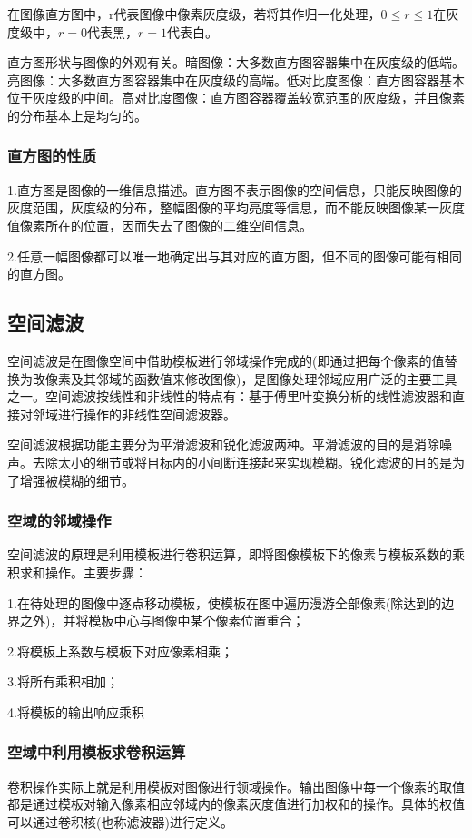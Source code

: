 \documentclass[11pt]{article}
\begin{document}
在图像直方图中，r代表图像中像素灰度级，若将其作归一化处理，$0\leq r\leq 1$在灰度级中，$r=0$代表黑，$r=1$代表白。

直方图形状与图像的外观有关。暗图像：大多数直方图容器集中在灰度级的低端。亮图像：大多数直方图容器集中在灰度级的高端。低对比度图像：直方图容器基本位于灰度级的中间。高对比度图像：直方图容器覆盖较宽范围的灰度级，并且像素的分布基本上是均匀的。
\subsubsection{直方图的性质}
1.直方图是图像的一维信息描述。直方图不表示图像的空间信息，只能反映图像的灰度范围，灰度级的分布，整幅图像的平均亮度等信息，而不能反映图像某一灰度值像素所在的位置，因而失去了图像的二维空间信息。

2.任意一幅图像都可以唯一地确定出与其对应的直方图，但不同的图像可能有相同的直方图。

\subsection{空间滤波}
空间滤波是在图像空间中借助模板进行邻域操作完成的(即通过把每个像素的值替换为改像素及其邻域的函数值来修改图像)，是图像处理邻域应用广泛的主要工具之一。空间滤波按线性和非线性的特点有：基于傅里叶变换分析的线性滤波器和直接对邻域进行操作的非线性空间滤波器。

空间滤波根据功能主要分为平滑滤波和锐化滤波两种。平滑滤波的目的是消除噪声。去除太小的细节或将目标内的小间断连接起来实现模糊。锐化滤波的目的是为了增强被模糊的细节。

\subsubsection{空域的邻域操作}
空间滤波的原理是利用模板进行卷积运算，即将图像模板下的像素与模板系数的乘积求和操作。主要步骤：

\noindent 1.在待处理的图像中逐点移动模板，使模板在图中遍历漫游全部像素(除达到的边界之外)，并将模板中心与图像中某个像素位置重合；

\noindent 2.将模板上系数与模板下对应像素相乘；

\noindent 3.将所有乘积相加；

\noindent 4.将模板的输出响应乘积

\subsubsection{空域中利用模板求卷积运算}
卷积操作实际上就是利用模板对图像进行领域操作。输出图像中每一个像素的取值都是通过模板对输入像素相应邻域内的像素灰度值进行加权和的操作。具体的权值可以通过卷积核(也称滤波器)进行定义。
\end{document}
